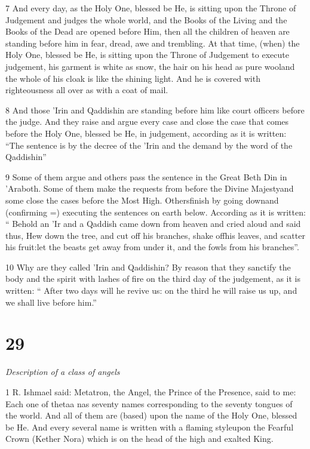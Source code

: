 \par 7 And every day, as the Holy One, blessed be He, is sitting upon the Throne of Judgement and judges the whole world, and the Books of the Living and the Books of the Dead are opened before Him, then all the children of heaven are standing before him in fear, dread, awe and trembling. At that time, (when) the Holy One, blessed be He, is sitting upon the Throne of Judgement to execute judgement, his garment is white as snow, the hair on his head as pure wooland the whole of his cloak is like the shining light. And he is covered with righteousness all over as with a coat of mail. 

\par 8 And those 'Irin and Qaddishin are standing before him like court officers before the judge. And they raise and argue every case and close the case that comes before the Holy One, blessed be He, in judgement, according as it is written: “The sentence is by the decree of the 'Irin and the demand by the word of the Qaddishin”

\par 9 Some of them argue and others pass the sentence in the Great Beth Din in 'Araboth. Some of them make the requests from before the Divine Majestyand some close the cases before the Most High. Othersfinish by going downand (confirming =) executing the sentences on earth below. According as it is written: “ Behold an 'Ir and a Qaddish came down from heaven and cried aloud and said thus, Hew down the tree, and cut off his branches, shake offhis leaves, and scatter his fruit:let the beasts get away from under it, and the fowls from his branches”. 

\par 10 Why are they called 'Irin and Qaddishin? By reason that they sanctify the body and the spirit with lashes of fire on the third day of the judgement, as it is written: “ After two days will he revive us: on the third he will raise us up, and we shall live before him.” 

\chapter{29}

\par \textit{Description of a class of angels}

\par 1 R. Ishmael said: Metatron, the Angel, the Prince of the Presence, said to me: Each one of thetaa nas seventy names corresponding to the seventy tongues of the world. And all of them are (based) upon the name of the Holy One, blessed be He. And every several name is written with a flaming styleupon the Fearful Crown (Kether Nora) which is on the head of the high and exalted King. 

